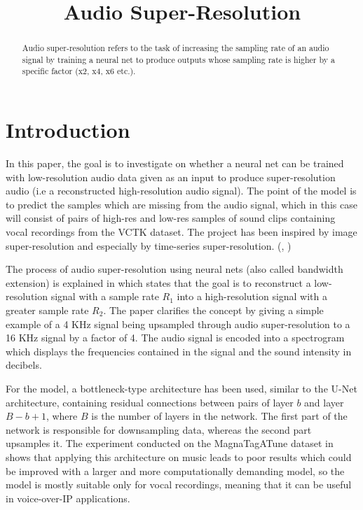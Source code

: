 \documentclass[conference]{IEEEtran}
\begin{document}
\title{Audio Super-Resolution\\
}

\author{
}

\maketitle

\begin{abstract}
Audio super-resolution refers to the task of increasing the sampling rate of an audio signal by training a neural net to produce outputs whose sampling rate is higher by a specific factor (x2, x4, x6 etc.).
\end{abstract}

\section{Introduction}
	In this paper, the goal is to investigate on whether a neural net can be trained with low-resolution audio data given as an input to produce super-resolution audio (i.e a reconstructed high-resolution audio signal). The point of the model is to predict the samples which are missing from the audio signal, which in this case will consist of pairs of high-res and low-res samples of sound clips containing vocal recordings from the VCTK dataset. The project has been inspired by image super-resolution and especially by time-series super-resolution. (\textcite{kuleshov2017audio}, \textcite{hetherly2017audio})

	The process of audio super-resolution using neural nets (also called bandwidth extension) is explained in \textcite{kuleshov2017audio} which states that the goal is to reconstruct a low-resolution signal with a sample rate $ R_{1} $ into a high-resolution signal with a greater sample rate $ R_{2} $. The paper clarifies the concept by giving a simple example of a 4 KHz signal being upsampled through audio super-resolution to a 16 KHz signal by a factor of 4. The audio signal is encoded into a spectrogram which displays the frequencies contained in the signal and the sound intensity in decibels. 

	For the model, a bottleneck-type architecture has been used, similar to the U-Net architecture, containing residual connections between pairs of layer $ b $ and layer $ B - b + 1 $, where $ B $ is the number of layers in the network. The first part of the network is responsible for downsampling data, whereas the second part upsamples it. The experiment conducted on the MagnaTagATune dataset in \textcite{kuleshov2017audio} shows that applying this architecture on music leads to poor results which could be improved with a larger and more computationally demanding model, so the model is mostly suitable only for vocal recordings, meaning that it can be useful in voice-over-IP applications.
\end{document}
